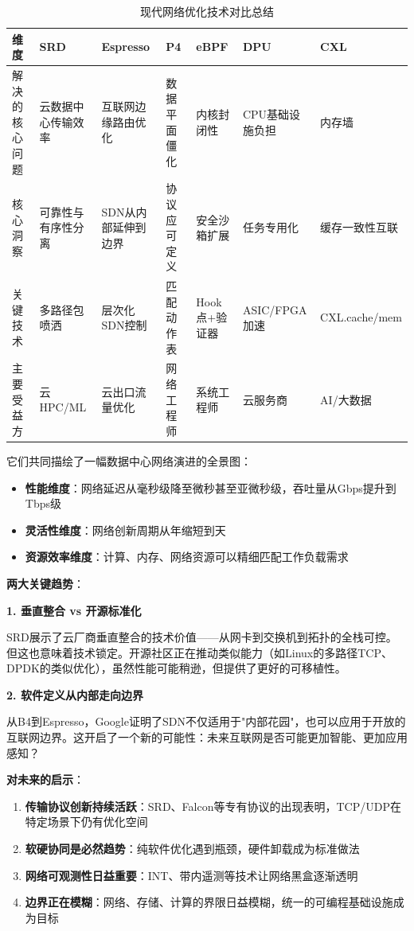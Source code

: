\begin{table}[h]
\centering
\caption{现代网络优化技术对比总结}
\begin{tabular}{p{2.5cm}p{2cm}p{2cm}p{2cm}p{1.8cm}p{1.8cm}}
\toprule
\textbf{维度} & \textbf{SRD} & \textbf{Espresso} & \textbf{P4} & \textbf{eBPF} & \textbf{DPU} & \textbf{CXL} \\
\midrule
解决的核心问题 & 云数据中心传输效率 & 互联网边缘路由优化 & 数据平面僵化 & 内核封闭性 & CPU基础设施负担 & 内存墙 \\
核心洞察 & 可靠性与有序性分离 & SDN从内部延伸到边界 & 协议应可定义 & 安全沙箱扩展 & 任务专用化 & 缓存一致性互联 \\
关键技术 & 多路径包喷洒 & 层次化SDN控制 & 匹配动作表 & Hook点+验证器 & ASIC/FPGA加速 & CXL.cache/mem \\
主要受益方 & 云HPC/ML & 云出口流量优化 & 网络工程师 & 系统工程师 & 云服务商 & AI/大数据 \\
\bottomrule
\end{tabular}
\end{table}

它们共同描绘了一幅数据中心网络演进的全景图：

\begin{itemize}
    \item \textbf{性能维度}：网络延迟从毫秒级降至微秒甚至亚微秒级，吞吐量从Gbps提升到Tbps级
    \item \textbf{灵活性维度}：网络创新周期从年缩短到天
    \item \textbf{资源效率维度}：计算、内存、网络资源可以精细匹配工作负载需求
\end{itemize}

\textbf{两大关键趋势}：

\textbf{1. 垂直整合 vs 开源标准化}

SRD展示了云厂商垂直整合的技术价值——从网卡到交换机到拓扑的全栈可控。但这也意味着技术锁定。开源社区正在推动类似能力（如Linux的多路径TCP、DPDK的类似优化），虽然性能可能稍逊，但提供了更好的可移植性。

\textbf{2. 软件定义从内部走向边界}

从B4到Espresso，Google证明了SDN不仅适用于"内部花园"，也可以应用于开放的互联网边界。这开启了一个新的可能性：未来互联网是否可能更加智能、更加应用感知？

\textbf{对未来的启示}：

\begin{enumerate}
    \item \textbf{传输协议创新持续活跃}：SRD、Falcon等专有协议的出现表明，TCP/UDP在特定场景下仍有优化空间
    \item \textbf{软硬协同是必然趋势}：纯软件优化遇到瓶颈，硬件卸载成为标准做法
    \item \textbf{网络可观测性日益重要}：INT、带内遥测等技术让网络黑盒逐渐透明
    \item \textbf{边界正在模糊}：网络、存储、计算的界限日益模糊，统一的可编程基础设施成为目标
\end{enumerate}

